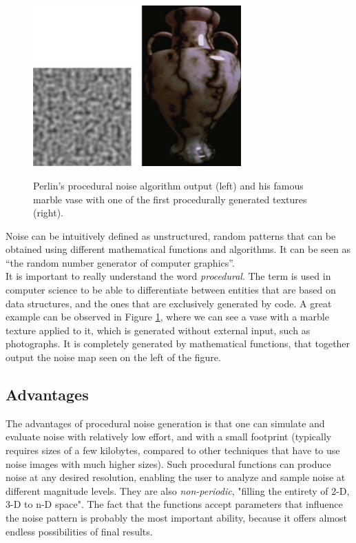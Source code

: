 \begin{figure}[htp]
    \centering
    \includegraphics[width = 8cm]{figures/perlinMarbleVase.PNG}
    \caption{Perlin's procedural noise algorithm output (left) and his famous marble vase with one of the first procedurally generated textures (right).}
    \cite{perlin1985image}
    \label{fig:perlinMarbleVase}
\end{figure}

Noise can be intuitively defined as unstructured, random patterns that can be obtained using different mathematical functions and algorithms. It can be seen as “the random number generator of computer graphics”\cite{lagae2010survey}.\\

It is important to really understand the word \textit{procedural}. The term is used in computer science to be able to differentiate between entities that are based on data structures, and the ones that are exclusively generated by code\cite{lagae2010survey}. A great example can be observed in Figure \ref{fig:perlinMarbleVase}, where we can see a vase with a marble texture applied to it, which is generated without external input, such as photographs. It is completely generated by mathematical functions, that together output the noise map seen on the left of the figure.

\subsection{Advantages}

The advantages of procedural noise generation is that one can simulate and evaluate noise with relatively low effort, and with a small footprint (typically requires sizes of a few kilobytes, compared to other techniques that have to use noise images with much higher sizes). Such procedural functions can produce noise at any desired resolution, enabling the user to analyze and sample noise at different magnitude levels. They are also \textit{non-periodic}, "filling the entirety of 2-D, 3-D to n-D space". The fact that the functions accept parameters that influence the noise pattern is probably the most important ability, because it offers almost endless possibilities of final results\cite{lagae2010survey}.

